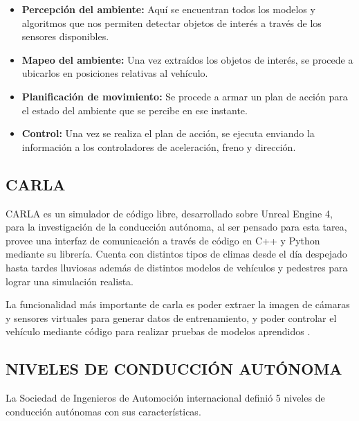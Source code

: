     \begin{itemize}[nosep]
        \item \textbf{Percepción del ambiente:} Aquí se encuentran todos los modelos y algoritmos que nos permiten detectar objetos de interés a través de los sensores disponibles.
        \item \textbf{Mapeo del ambiente:} Una vez extraídos los objetos de interés, se procede a ubicarlos en posiciones relativas al vehículo.
        \item \textbf{Planificación de movimiento:} Se procede a armar un plan de acción para el estado del ambiente que se percibe en ese instante.
        \item \textbf{Control:} Una vez se realiza el plan de acción, se ejecuta enviando la información a los controladores de aceleración, freno y dirección.
    \end{itemize}
	
	\subsection{CARLA}
		CARLA es un simulador de código libre, desarrollado sobre Unreal Engine 4, para la investigación de la conducción autónoma, al ser pensado para esta tarea, provee una interfaz de comunicación a través de código en C++ y Python mediante su librería. Cuenta con distintos tipos de climas desde el día despejado hasta tardes lluviosas además de distintos modelos de vehículos y pedestres para lograr una simulación realista.
		
		La funcionalidad más importante de carla es poder extraer la imagen de cámaras y sensores virtuales para generar datos de entrenamiento, y poder controlar el vehículo mediante código para realizar pruebas de modelos aprendidos \citep{Dosovitskiy17}.
		
	\subsection{NIVELES DE CONDUCCIÓN AUTÓNOMA}
	La Sociedad de Ingenieros de Automoción internacional definió 5 niveles de conducción autónomas con sus características.
	
